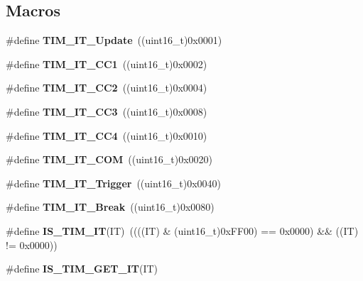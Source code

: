 \subsection*{Macros}
\begin{DoxyCompactItemize}
\item 
\mbox{\label{group___t_i_m__interrupt__sources_ga8fb63577fec9a3e7c7f5f3eb775ee624}} 
\#define {\bfseries T\+I\+M\+\_\+\+I\+T\+\_\+\+Update}~((uint16\+\_\+t)0x0001)
\item 
\mbox{\label{group___t_i_m__interrupt__sources_ga02267a938ab4722c5013fffa447cf5a6}} 
\#define {\bfseries T\+I\+M\+\_\+\+I\+T\+\_\+\+C\+C1}~((uint16\+\_\+t)0x0002)
\item 
\mbox{\label{group___t_i_m__interrupt__sources_ga60f6b6c424b62ca58d3fafd8f5955e4f}} 
\#define {\bfseries T\+I\+M\+\_\+\+I\+T\+\_\+\+C\+C2}~((uint16\+\_\+t)0x0004)
\item 
\mbox{\label{group___t_i_m__interrupt__sources_ga6aef020aebafd9e585283fbbaf8b841f}} 
\#define {\bfseries T\+I\+M\+\_\+\+I\+T\+\_\+\+C\+C3}~((uint16\+\_\+t)0x0008)
\item 
\mbox{\label{group___t_i_m__interrupt__sources_ga1dce7f1bc32a258f2964cb7c05f413a6}} 
\#define {\bfseries T\+I\+M\+\_\+\+I\+T\+\_\+\+C\+C4}~((uint16\+\_\+t)0x0010)
\item 
\mbox{\label{group___t_i_m__interrupt__sources_gaeb7eff6c39922814e7ee47c0820c3d9f}} 
\#define {\bfseries T\+I\+M\+\_\+\+I\+T\+\_\+\+C\+OM}~((uint16\+\_\+t)0x0020)
\item 
\mbox{\label{group___t_i_m__interrupt__sources_ga339629d21f2490729b28905f5c04bad1}} 
\#define {\bfseries T\+I\+M\+\_\+\+I\+T\+\_\+\+Trigger}~((uint16\+\_\+t)0x0040)
\item 
\mbox{\label{group___t_i_m__interrupt__sources_gad16adab3ac1a4a552a86da069702f24b}} 
\#define {\bfseries T\+I\+M\+\_\+\+I\+T\+\_\+\+Break}~((uint16\+\_\+t)0x0080)
\item 
\mbox{\label{group___t_i_m__interrupt__sources_ga14fce0f8dbe0925e45b415b34bd162c9}} 
\#define {\bfseries I\+S\+\_\+\+T\+I\+M\+\_\+\+IT}(IT)~((((IT) \& (uint16\+\_\+t)0x\+F\+F00) == 0x0000) \&\& ((\+I\+T) != 0x0000))
\item 
\#define {\bfseries I\+S\+\_\+\+T\+I\+M\+\_\+\+G\+E\+T\+\_\+\+IT}(IT)
\end{DoxyCompactItemize}


